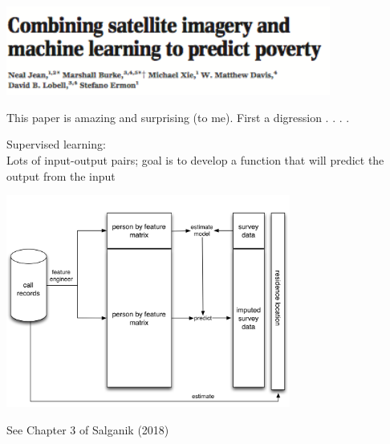 \documentclass[aspectratio=169]{beamer}
\begin{document}
\begin{frame}

\begin{center}
\includegraphics[width=0.8\textwidth]{figures/jean_combining_2016_title}
\end{center}

\vfill

This paper is amazing and surprising (to me).  First a digression . . . .

\end{frame}
\begin{frame}

Supervised learning:\\
Lots of input-output pairs; goal is to develop a function that will predict the output from the input

\end{frame}
\begin{frame}

\begin{center}
\includegraphics[width=0.7\textwidth]{figures/blumenstock_predicting_2015_schematic_6}
\end{center}
\vfill
See Chapter 3 of Salganik (2018)
\end{frame}
\end{document}
